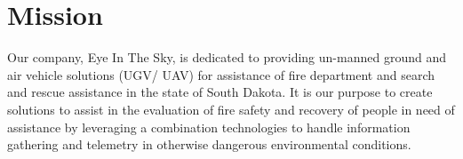 
\chapter{Mission}

Our company, Eye In The Sky, is dedicated to providing un-manned ground and air vehicle solutions (UGV/ UAV) for assistance of fire department and search and rescue assistance in the state of South Dakota.  It is our purpose to create solutions to assist in the evaluation of fire safety and recovery of people in need of assistance by leveraging a combination technologies to handle information gathering and telemetry in otherwise dangerous environmental conditions.